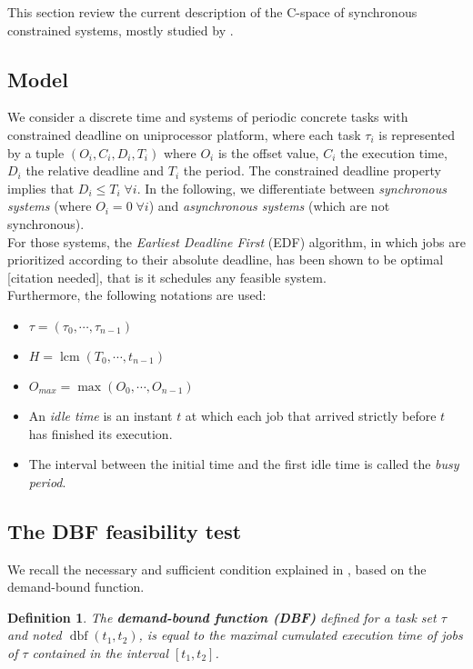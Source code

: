 \documentclass[times, 10pt,twocolumn, a4paper]{article}
\newtheorem{definition}{Definition}
\newcommand{\dbf}[1]{\operatorname{dbf}(#1)}
\begin{document}
This section review the current description of the C-space of synchronous constrained systems, mostly studied by \cite{george2009characterization}.

  \subsection{Model}

  We consider a discrete time and systems of periodic concrete tasks with constrained deadline on uniprocessor platform, where each task $\tau_i$ is represented by a tuple $(O_i, C_i, D_i, T_i)$ where $O_i$ is the offset value, $C_i$ the execution time, $D_i$ the relative deadline and $T_i$ the period. The constrained deadline property implies that $D_i \leq T_i \; \forall i$. In the following, we differentiate between \emph{synchronous systems} (where $O_i = 0 \; \forall i$) and \emph{asynchronous systems} (which are not synchronous).\\

  For those systems, the \emph{Earliest Deadline First} (EDF) algorithm, in which jobs are prioritized according to their absolute deadline, has been shown to be optimal [citation needed], that is it schedules any feasible system.\\

  Furthermore, the following notations are used:
  \begin{itemize}
    \item $\tau = (\tau_0, \cdots, \tau_{n-1})$
    \item $H = \operatorname{lcm}(T_0, \cdots, t_{n-1})$
    \item $O_{max} = \max (O_0, \cdots, O_{n-1})$
    \item An \emph{idle time} is an instant $t$ at which each job that arrived strictly before $t$ has finished its execution.
    \item The interval between the initial time and the first idle time is called the \emph{busy period}.
  \end{itemize}

  \subsection{The DBF feasibility test}

  We recall the necessary and sufficient condition explained in \cite{baruah1999generalized, baruah1990algorithms}, based on the demand-bound function.

  \begin{definition}
  The \textbf{demand-bound function (DBF)}
  \cite{baruah1999generalized, baruah1990algorithms} defined for a task set
  $\tau$ and noted $\dbf{t_1, t_2}$, is equal to the maximal cumulated execution time of jobs of $\tau$ contained in the interval $[t_1, t_2]$.
  \end{definition}
\end{document}
